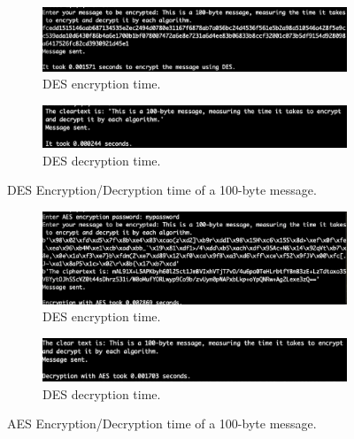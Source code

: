 \begin{figure}[h!]
  \centering
  \begin{subfigure}[b]{1.0\linewidth}
    \includegraphics[width=\linewidth]{desencrypt.jpg}
    \caption{DES encryption time.}
  \end{subfigure}
  \begin{subfigure}[b]{1.0\linewidth}
    \includegraphics[width=\linewidth]{desdecrypt.jpg}
    \caption{DES decryption time.}
  \end{subfigure}
  \caption{DES Encryption/Decryption time of a 100-byte message.}
  \label{fig:des}
\end{figure}

\begin{figure}[h!]
  \centering
  \begin{subfigure}[b]{1.0\linewidth}
    \includegraphics[width=\linewidth]{aesencrypt.jpg}
    \caption{DES encryption time.}
  \end{subfigure}
  \begin{subfigure}[b]{1.0\linewidth}
    \includegraphics[width=\linewidth]{aesdecrypt.jpg}
    \caption{DES decryption time.}
  \end{subfigure}
  \caption{AES Encryption/Decryption time of a 100-byte message.}
  \label{fig:aes}
\end{figure}



